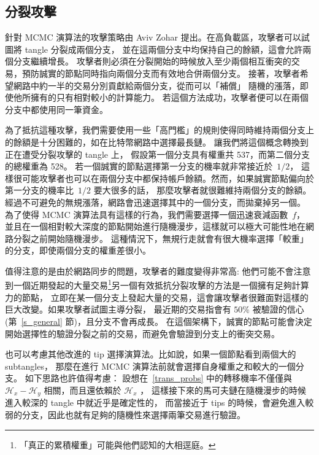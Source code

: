 \documentclass[12pt]{article}
\newcommand{\HH}{\mathcal{H}}
\begin{document}
\begin{CJK}{UTF8}{bkai}
\subsection{分裂攻擊}
\label{s_splitting}
針對 MCMC 演算法的攻擊策略由 Aviv Zohar 提出。在高負載區，攻擊者可以試圖將 tangle 分裂成兩個分支，
並在這兩個分支中均保持自己的餘額，這會允許兩個分支繼續增長。
攻擊者則必須在分裂開始的時候放入至少兩個相互衝突的交易，預防誠實的節點同時指向兩個分支而有效地合併兩個分支。
接著，攻擊者希望網路中約一半的交易分別貢獻給兩個分支，從而可以「補償」 隨機的漲落，即使他所擁有的只有相對較小的計算能力。
若這個方法成功，攻擊者便可以在兩個分支中都使用同一筆資金。

為了抵抗這種攻擊，我們需要使用一些「高門檻」的規則使得同時維持兩個分支上的餘額是十分困難的，如在比特幣網路中選擇最長鏈。
讓我們將這個概念轉換到正在遭受分裂攻擊的 tangle 上，
假設第一個分支具有權重共 537，而第二個分支的總權重為 528。
若一個誠實的節點選擇第一分支的機率就非常接近於~$1/2$，
這樣很可能攻擊者也可以在兩個分支中都保持帳戶餘額。然而，如果誠實節點偏向於第一分支的機率比~$1/2$ 要大很多的話，
那麼攻擊者就很難維持兩個分支的餘額。經過不可避免的無規漲落，網路會迅速選擇其中的一個分支，而拋棄掉另一個。
為了使得 MCMC 演算法具有這樣的行為，我們需要選擇一個迅速衰減函數~$f$，
並且在一個相對較大深度的節點開始進行隨機漫步，這樣就可以極大可能性地在網路分裂之前開始隨機漫步。
這種情況下，無規行走就會有很大機率選擇「較重」的分支，即使兩個分支的權重差很小。 
   
值得注意的是由於網路同步的問題，攻擊者的難度變得非常高: 他們可能不會注意到一個近期發起的大量交易\footnote{
「真正的累積權重」可能與他們認知的大相逕庭。}另一個有效抵抗分裂攻擊的方法是一個擁有足夠計算力的節點，
立即在某一個分支上發起大量的交易，這會讓攻擊者很難面對這樣的巨大改變。如果攻擊者試圖主導分裂，
最近期的交易指會有 $50$\% 被驗證的信心 (第~\ref{s_general} 節)，且分支不會再成長。
在這個架構下，誠實的節點可能會決定開始選擇性的驗證分裂之前的交易，而避免會驗證到分支上的衝突交易。
 
也可以考慮其他改進的 tip 選擇演算法。比如說，如果一個節點看到兩個大的 subtangles，
那麼在進行 MCMC 演算法前就會選擇自身權重之和較大的一個分支。
如下思路也許值得考慮： 設想在~\eqref{trans_probs} 中的轉移機率不僅僅與 $\HH_x-\HH_y$ 相關，而且還依賴於 $\HH_x$ ，
這樣接下來的馬可夫鏈在隨機漫步的時候進入較深的 tangle 中就近乎是確定性的，
而當接近于 tips 的時候，會避免進入較弱的分支，因此也就有足夠的隨機性來選擇兩筆交易進行驗證。



\end{CJK}
\end{document}
